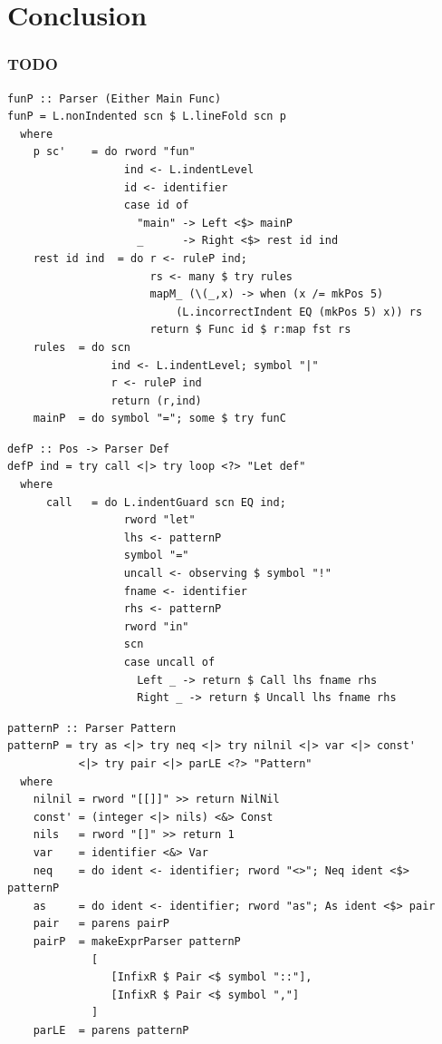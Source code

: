 \documentclass[a4paper]{article}
\begin{document}
\section{Conclusion}
\label{sec:org7aab773}
\subsubsection{TODO}
\label{sec:orge9e92ca}



\appendix
\begin{verbatim}
funP :: Parser (Either Main Func)
funP = L.nonIndented scn $ L.lineFold scn p
  where
    p sc'    = do rword "fun"
                  ind <- L.indentLevel
                  id <- identifier
                  case id of
                    "main" -> Left <$> mainP
                    _      -> Right <$> rest id ind
    rest id ind  = do r <- ruleP ind;
                      rs <- many $ try rules
                      mapM_ (\(_,x) -> when (x /= mkPos 5)
                          (L.incorrectIndent EQ (mkPos 5) x)) rs
                      return $ Func id $ r:map fst rs
    rules  = do scn
                ind <- L.indentLevel; symbol "|"
                r <- ruleP ind
                return (r,ind)
    mainP  = do symbol "="; some $ try funC
\end{verbatim}
\begin{verbatim}
defP :: Pos -> Parser Def
defP ind = try call <|> try loop <?> "Let def"
  where
      call   = do L.indentGuard scn EQ ind;
                  rword "let"
                  lhs <- patternP
                  symbol "="
                  uncall <- observing $ symbol "!"
                  fname <- identifier
                  rhs <- patternP
                  rword "in"
                  scn
                  case uncall of
                    Left _ -> return $ Call lhs fname rhs
                    Right _ -> return $ Uncall lhs fname rhs
\end{verbatim}
\begin{verbatim}
patternP :: Parser Pattern
patternP = try as <|> try neq <|> try nilnil <|> var <|> const'
           <|> try pair <|> parLE <?> "Pattern"
  where
    nilnil = rword "[[]]" >> return NilNil
    const' = (integer <|> nils) <&> Const
    nils   = rword "[]" >> return 1
    var    = identifier <&> Var
    neq    = do ident <- identifier; rword "<>"; Neq ident <$> patternP
    as     = do ident <- identifier; rword "as"; As ident <$> pair
    pair   = parens pairP
    pairP  = makeExprParser patternP
             [
                [InfixR $ Pair <$ symbol "::"],
                [InfixR $ Pair <$ symbol ","]
             ]
    parLE  = parens patternP
\end{verbatim}
\end{document}
